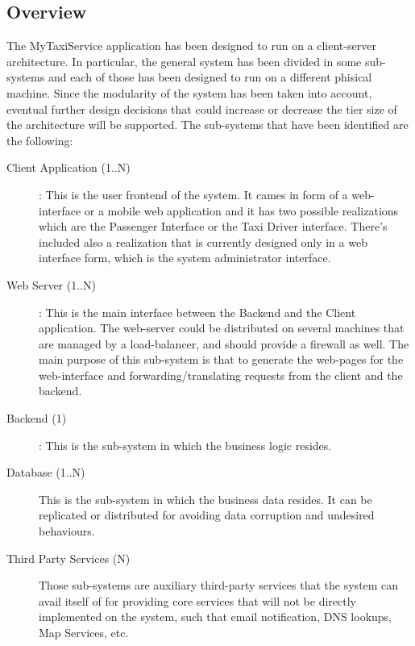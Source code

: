 \documentclass[11pt, a4paper,titlepage]{article}
\newcommand{\productname}{MyTaxiService }
\begin{document}
\subsection{Overview}
The \productname application has been designed to run on a client-server architecture. \newline
In particular, the general system has been divided in some sub-systems and each of those has been designed to run on a different phisical machine.
Since the modularity of the system has been taken into account, eventual further design decisions that could increase or decrease the tier size of the architecture will be supported. \newline
The sub-systems that have been identified are the following:
\begin{description}
	\item[Client Application (1..N)]: This is the user frontend of the system. It cames in form of a web-interface or a mobile web application and it has two possible realizations which are the Passenger Interface or the Taxi Driver interface. 
	There's included also a realization that is currently designed only in a web interface form, which is the system administrator interface.
	\item[Web Server (1..N)]: This is the main interface between the Backend and the Client application. The web-server could be distributed on several machines that are managed by a load-balancer, and should provide a firewall as well. The main purpose of this sub-system is that to generate the web-pages for the web-interface and forwarding/translating requests from the client and the backend.
	\item[Backend (1)]: This is the sub-system in which the business logic resides.
	\item[Database (1..N)] This is the sub-system in which the business data resides. It can be replicated or distributed for avoiding data corruption and undesired behaviours.
	\item[Third Party Services (N)] Those sub-systems are auxiliary third-party services that the system can avail itself of for providing core services that will not be directly implemented on the system, such that email notification, DNS lookups, Map Services, etc. 
\end{description}
\newpage
\end{document}
